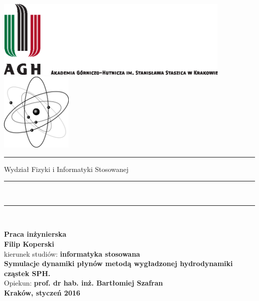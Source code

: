 


\thispagestyle{empty}

\includegraphics[height=37.5mm]{agh_nzw_a_pl_1w_wbr_cmyk.eps}
\includegraphics[height=37.5mm]{logo_WFiIS.png}\\
\rule{30mm}{0pt}
{\large\textsf{Wydział Fizyki i Informatyki Stosowanej}}\\
\rule{\textwidth}{3pt}\\
\rule[2ex]
{\textwidth}{1pt}\\
\vspace{7ex}
\begin{center}
{\bf\LARGE\textsf{Praca inżynierska}}\\
\vspace{13ex}
{\bf\Large\textsf{Filip Koperski}}\\
\vspace{3ex}
{\sf \small kierunek studiów:} {\bf\small\textsf{informatyka stosowana}}\\
\vspace{15ex}
{\bf\huge\textsf{Symulacje dynamiki płynów metodą wygładzonej hydrodynamiki cząstek SPH.}}\\
\vspace{14ex}
{\sf \Large Opiekun:} {\bf\Large\textsf{prof. dr hab. inż. Bartłomiej Szafran}}\\
\vspace{22ex}
\textsf{\bf\large\textsf{Kraków, styczeń 2016}}
\end{center}

